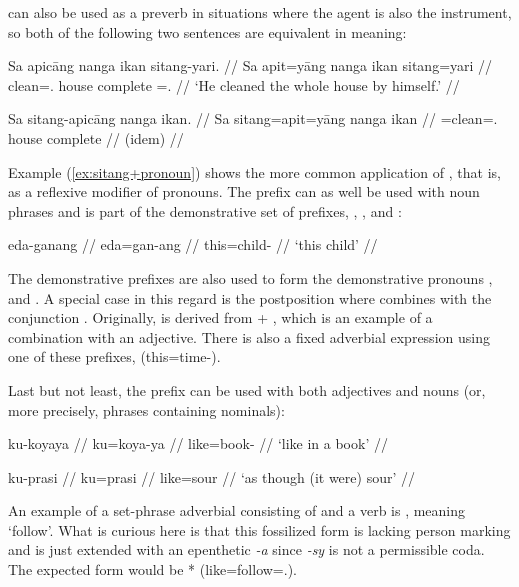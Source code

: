  can also be used as a preverb in situations where the 
agent is also the instrument, so both of the following two sentences are 
equivalent in meaning:

\pex
\a\label{ex:sitang+pronoun}\begingl
	\gla Sa apicāng nanga ikan sitang-yari. //
	\glb Sa apit=yāng nanga ikan sitang=yari //
	\glc \PatT{} clean=\Tsg{}.\Aarg{} house complete 
		\Refl{}=\TsgM{}.\Ins{} //
	\glft `He cleaned the whole house by himself.' //
\endgl

\a\begingl
	\gla Sa sitang-apicāng nanga ikan. //
	\glb Sa sitang=apit=yāng nanga ikan //
	\glc \PatT{} \Refl{}=clean=\Tsg{}.\Aarg{} house complete //
	\glft (idem) //
\endgl
\xe

\label{nounprefixes}
Example (\ref{ex:sitang+pronoun}) shows the more common application of 
, that is, as a reflexive modifier of pronouns. The 
prefix  can as well be used with noun phrases and is part of the 
demonstrative set of prefixes, , , 
and :

\ex\begingl
	\gla eda-ganang //
	\glb eda=gan-ang //
	\glc this=child-\Aarg{} //
	\glft `this child' //
\endgl\xe

The demonstrative prefixes are also used to form the demonstrative 
pronouns , 
 and . A special case 
in this regard is the postposition  where  combines with the conjunction 
. Originally, 
 is derived from  + 
, which is an example of a combination 
with an adjective. There is also a fixed adverbial expression using one of 
these prefixes,  
(this=time-\Dat{}).

Last but not least, the prefix  can be used 
with both adjectives and nouns (or, more precisely, phrases containing 
nominals):

\pex
\a\begingl
	\gla ku-koyaya //
	\glb ku=koya-ya //
	\glc like=book-\Loc{} //
	\glft `like in a book' //
\endgl

\a\begingl
	\gla ku-prasi //
	\glb ku=prasi //
	\glc like=sour //
	\glft `as though (it were) sour' //
\endgl
\xe

An example of a set-phrase adverbial consisting of  and a verb 
is ,  meaning `follow'. 
What is curious here is that this fossilized form is lacking person marking 
and is just extended with an epenthetic \textit{-a} since \textit{-sy} is not 
a permissible coda. The expected form would be 
* (like=follow=\TsgI{}.\Aarg{}).

